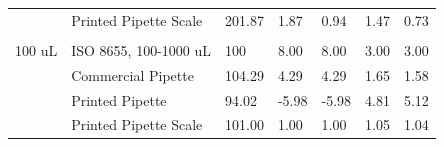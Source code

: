 \documentclass[10pt,letterpaper]{article}
\begin{document}
\begin{table}[!ht]
\begin{adjustwidth}{-2.25in}{0in}
\begin{tabular}{lllllll}
        & Printed Pipette Scale & 201.87  & 1.87             & 0.94         & 1.47         & 0.73          \\
        &                       &         &                  &              &              &               \\
100 uL  & ISO 8655, 100-1000 uL & 100     & 8.00             & 8.00         & 3.00         & 3.00          \\
        & Commercial Pipette    & 104.29  & 4.29             & 4.29         & 1.65         & 1.58          \\
        & Printed Pipette       & 94.02   & -5.98            & -5.98        & 4.81         & 5.12          \\
        & Printed Pipette Scale & 101.00  & 1.00             & 1.00         & 1.05         & 1.04         
\end{tabular}
\end{adjustwidth}
\end{table}
\end{document}
